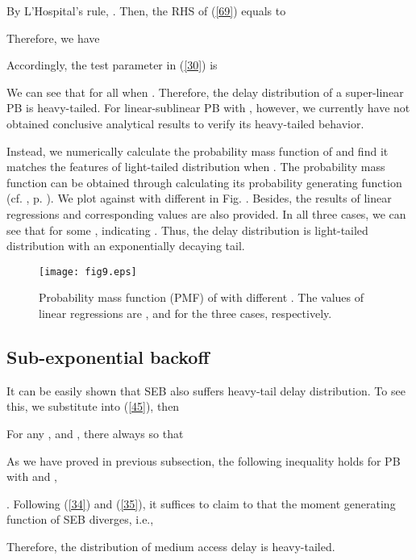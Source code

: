 \documentclass[journal]{IEEEtran}
\begin{document}
By L'Hospital's rule, . Then, the RHS of (\ref{69}) equals to

Therefore, we have

Accordingly, the test parameter  in (\ref{30}) is


We can see that  for all  when . Therefore, the delay distribution of a super-linear PB is heavy-tailed. For linear-sublinear PB with , however, we currently have not obtained conclusive analytical results to verify its heavy-tailed behavior.

Instead, we numerically calculate the probability mass function of  and find it matches the features of light-tailed distribution when . The probability mass function can be obtained through calculating its probability generating function (cf. \cite{2006:Mieghem}, p. ). We plot  against  with different  in Fig. . Besides, the results of linear regressions and corresponding  values are also provided. In all three cases, we can see that  for some , indicating . Thus, the delay distribution is light-tailed distribution with an exponentially decaying tail.


\begin{figure}
\centering
  \begin{center}
    \texttt{[image: fig9.eps]}
  \end{center}
  \caption{Probability mass function (PMF) of  with different . The  values of linear regressions are ,  and  for the three cases, respectively.}
  \label{59}
\end{figure}

\subsection{Sub-exponential backoff}
It can be easily shown that SEB also suffers heavy-tail delay distribution. To see this, we substitute  into (\ref{45}), then

For any ,  and , there always  so that

As we have proved in previous subsection, the following inequality holds for PB with  and ,

. Following (\ref{34}) and (\ref{35}), it suffices to claim to that the moment generating function of SEB diverges, i.e.,

Therefore, the distribution of medium access delay is heavy-tailed.
\end{document}
